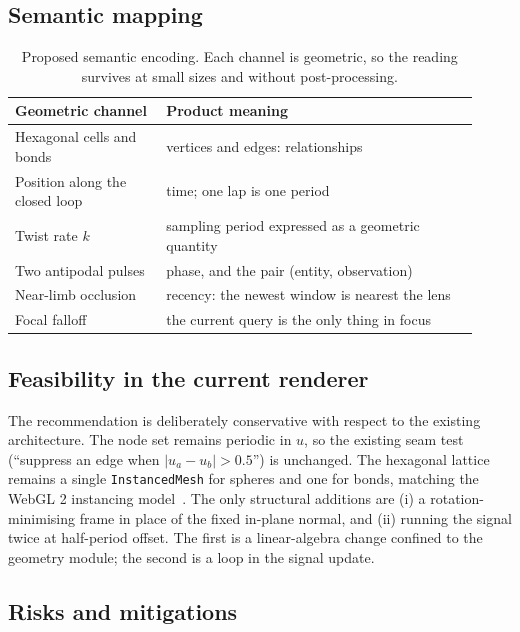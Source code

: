 \documentclass[11pt,a4paper]{article}
\theoremstyle{definition}
\begin{document}
\subsection{Semantic mapping}

\begin{table}[htbp]
\centering
\begin{tabular}{@{}p{0.3\linewidth}p{0.62\linewidth}@{}}
\toprule
\textbf{Geometric channel} & \textbf{Product meaning} \\
\midrule
Hexagonal cells and bonds & vertices and edges: relationships \\
Position along the closed loop & time; one lap is one period \\
Twist rate $k$ & sampling period expressed as a geometric quantity \\
Two antipodal pulses & phase, and the pair (entity, observation) \\
Near-limb occlusion & recency: the newest window is nearest the lens \\
Focal falloff & the current query is the only thing in focus \\
\bottomrule
\end{tabular}
\caption{Proposed semantic encoding. Each channel is geometric, so the reading
survives at small sizes and without post-processing.}
\label{tab:semantics}
\end{table}

\subsection{Feasibility in the current renderer}

The recommendation is deliberately conservative with respect to the existing
architecture. The node set remains periodic in $u$, so the existing seam test
(``suppress an edge when $\lvert u_a-u_b\rvert>0.5$'') is unchanged. The
hexagonal lattice remains a single \texttt{InstancedMesh} for spheres and one
for bonds, matching the WebGL 2 instancing model~\cite{webgl2,threejs}. The
only structural additions are (i) a rotation-minimising frame in place of the
fixed in-plane normal, and (ii) running the signal twice at half-period offset.
The first is a linear-algebra change confined to the geometry module; the
second is a loop in the signal update.

\subsection{Risks and mitigations}
\end{document}
